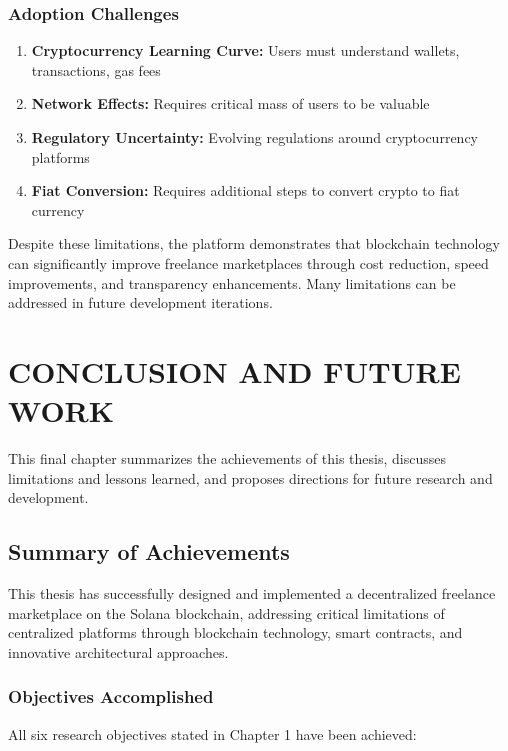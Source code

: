 \documentclass[a4paper,13pt,twoside]{report}
\theoremstyle{definition}
\begin{document}
\subsection{Adoption Challenges}

\begin{enumerate}
    \item \textbf{Cryptocurrency Learning Curve:} Users must understand wallets, transactions, gas fees
    \item \textbf{Network Effects:} Requires critical mass of users to be valuable
    \item \textbf{Regulatory Uncertainty:} Evolving regulations around cryptocurrency platforms
    \item \textbf{Fiat Conversion:} Requires additional steps to convert crypto to fiat currency
\end{enumerate}

Despite these limitations, the platform demonstrates that blockchain technology can significantly improve freelance marketplaces through cost reduction, speed improvements, and transparency enhancements. Many limitations can be addressed in future development iterations.

\newpage
\chapter{CONCLUSION AND FUTURE WORK}
\label{chapter:conclusion}

This final chapter summarizes the achievements of this thesis, discusses limitations and lessons learned, and proposes directions for future research and development.

\section{Summary of Achievements}

This thesis has successfully designed and implemented a decentralized freelance marketplace on the Solana blockchain, addressing critical limitations of centralized platforms through blockchain technology, smart contracts, and innovative architectural approaches.

\subsection{Objectives Accomplished}

All six research objectives stated in Chapter 1 have been achieved:
\end{document}
